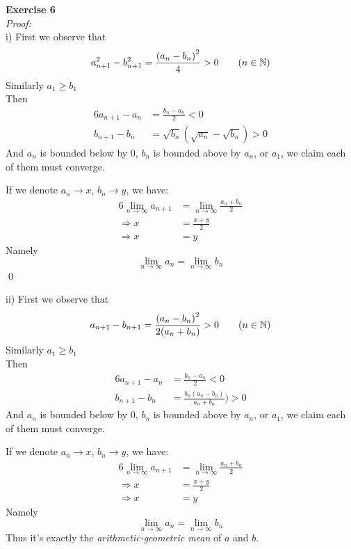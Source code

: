 \documentclass[12pt]{article}
\begin{document}
\textbf{Exercise 6}\\
\textit{Proof: }\\
i) First we observe that
\[
a_{n+1}^2-b_{n+1}^2=\frac{{(a_n-b_n)}^2}{4}>0 \tag{$n\in\mathbb{N}$}
\]
Similarly $a_1\ge b_1$\\
Then
\begin{alignat*}{6}
a_{n+1}-a_n&=\frac{b_n-a_n}{2}<0\\
b_{n+1}-b_n&=\sqrt{b_n}(\sqrt{a_n}-\sqrt{b_n})>0
\end{alignat*}
And $a_n$ is bounded below by 0, $b_n$ is bounded above by $a_n$, or $a_1$, we claim each of them must converge.\par
If we denote $a_n\to x$, $b_n\to y$, we have:
\begin{alignat*}{6}
			   \lim_{n\to\infty}a_{n+1}&=\lim_{n\to\infty}\frac{a_n+b_n}{2}\\
\Longrightarrow  x&=\frac{x+y}{2}\\
\Longrightarrow x&=y
\end{alignat*}
Namely
\[
\lim_{n\to\infty}a_n=\lim_{n\to\infty}b_n
\]
\qed
\par
ii) First we observe that
\[
a_{n+1}-b_{n+1}=\frac{{(a_n-b_n)}^2}{2(a_n+b_n)}>0 \tag{$n\in\mathbb{N}$}
\]
Similarly $a_1\ge b_1$\\
Then
\begin{alignat*}{6}
a_{n+1}-a_n&=\frac{b_n-a_n}{2}<0\\
b_{n+1}-b_n&=\frac{b_n(a_n-b_n)}{a_n+b_n})>0
\end{alignat*}
And $a_n$ is bounded below by 0, $b_n$ is bounded above by $a_n$, or $a_1$, we claim each of them must converge.\par
If we denote $a_n\to x$, $b_n\to y$, we have:
\begin{alignat*}{6}
			   \lim_{n\to\infty}a_{n+1}&=\lim_{n\to\infty}\frac{a_n+b_n}{2}\\
\Longrightarrow  x&=\frac{x+y}{2}\\
\Longrightarrow x&=y
\end{alignat*}
Namely
\[
\lim_{n\to\infty}a_n=\lim_{n\to\infty}b_n
\]
Thus it's exactly the \textit{arithmetic-geometric mean} of $a$ and $b$.
\end{document}
